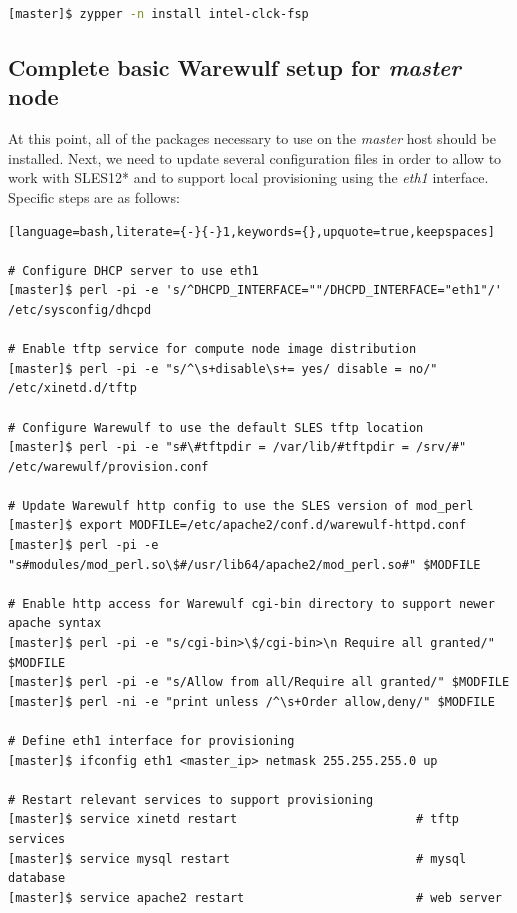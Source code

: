 \documentclass[letterpaper]{article}
\newcommand{\baseOS}{SLES12*}
\begin{document}
\begin{lstlisting}[language=bash,keywords={}]
[master]$ zypper -n install intel-clck-fsp
\end{lstlisting}


\subsection{Complete basic Warewulf setup for {\em master} node}

At this point, all of the packages necessary to use \Warewulf{} on the {\em
  master} host should be installed.  Next, we need to update several
configuration files in order to allow \Warewulf{} to work with \baseOS{} and to support
local provisioning using the {\em eth1} interface.  Specific steps are as
follows:


\begin{lstlisting}[language=bash,literate={-}{-}1,keywords={},upquote=true,keepspaces]

# Configure DHCP server to use eth1
[master]$ perl -pi -e 's/^DHCPD_INTERFACE=""/DHCPD_INTERFACE="eth1"/' /etc/sysconfig/dhcpd

# Enable tftp service for compute node image distribution
[master]$ perl -pi -e "s/^\s+disable\s+= yes/ disable = no/" /etc/xinetd.d/tftp

# Configure Warewulf to use the default SLES tftp location
[master]$ perl -pi -e "s#\#tftpdir = /var/lib/#tftpdir = /srv/#" /etc/warewulf/provision.conf

# Update Warewulf http config to use the SLES version of mod_perl
[master]$ export MODFILE=/etc/apache2/conf.d/warewulf-httpd.conf
[master]$ perl -pi -e "s#modules/mod_perl.so\$#/usr/lib64/apache2/mod_perl.so#" $MODFILE

# Enable http access for Warewulf cgi-bin directory to support newer apache syntax
[master]$ perl -pi -e "s/cgi-bin>\$/cgi-bin>\n Require all granted/" $MODFILE
[master]$ perl -pi -e "s/Allow from all/Require all granted/" $MODFILE
[master]$ perl -ni -e "print unless /^\s+Order allow,deny/" $MODFILE

# Define eth1 interface for provisioning
[master]$ ifconfig eth1 <master_ip> netmask 255.255.255.0 up

# Restart relevant services to support provisioning
[master]$ service xinetd restart                         # tftp services
[master]$ service mysql restart                          # mysql database
[master]$ service apache2 restart                        # web server
\end{lstlisting}
\end{document}

